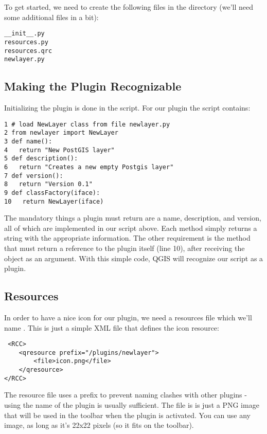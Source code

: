To get started, we need to create the following files in the  directory (we'll need some additional files in a bit):

\begin{verbatim}
__init__.py 
resources.py
resources.qrc
newlayer.py
\end{verbatim} 

\subsection{Making the Plugin Recognizable}

Initializing the plugin is done in the  script.
For our  plugin the script contains:

\begin{verbatim}
1 # load NewLayer class from file newlayer.py
2 from newlayer import NewLayer
3 def name():
4   return "New PostGIS layer"
5 def description():
6   return "Creates a new empty Postgis layer"
7 def version():
8   return "Version 0.1"
9 def classFactory(iface):
10   return NewLayer(iface)
\end{verbatim} 

The mandatory things a plugin must return are a name, description, and version, all of which are implemented in our script above.
Each method simply returns a string with the appropriate information.
The other requirement is the  method that must return a reference to the plugin itself (line 10), after receiving the  object as an argument.
With this simple code, QGIS will recognize our script as a plugin.

\subsection{Resources}

In order to have a nice icon for our plugin, we need a resources file which we'll name .
This is just a simple XML file that defines the icon resource:

\begin{verbatim}
 <RCC>
    <qresource prefix="/plugins/newlayer">
        <file>icon.png</file>
    </qresource>
</RCC> 
\end{verbatim} 

The resource file uses a prefix to prevent naming clashes with other plugins - using the name of the plugin is usually sufficient.
The  file is is just a PNG image that will be used in the toolbar when the plugin is activated.
You can use any image, as long as it's 22x22 pixels (so it fits on the toolbar).

